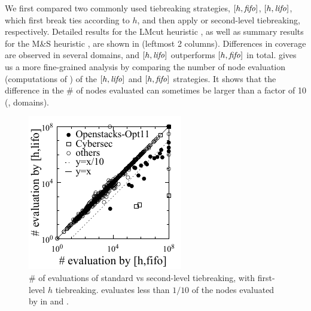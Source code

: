 We first compared two commonly used tiebreaking strategies, $[h,{\mbox{\textit{fifo}}}]$, $[h,{\mbox{\textit{lifo}}}]$, which
first break ties according to $h$, and then apply \fifo or \lifo
second-level tiebreaking, respectively.
Detailed results for the LMcut heuristic \cite{Helmert2009}, as well as summary results for the M\&S heuristic \cite{HelmertHHN14}, are
shown in  (leftmost 2 columns).
Differences in coverage are observed in several domains, and
$[h,{\mbox{\textit{lifo}}}]$ outperforms $[h,{\mbox{\textit{fifo}}}]$ in total.
 gives us a
more fine-grained analysis by comparing the number of node evaluation
(computations of \lmcut) of the $[h,{\mbox{\textit{lifo}}}]$ and $[h,{\mbox{\textit{fifo}}}]$ strategies.
It shows that the difference in the \# of nodes
evaluated can sometimes be larger than a factor of 10 (,  domains).
\begin{figure}[tb]
 \centering {}
 \includegraphics{tables/aaai16-30min-5min-cut/aaai16prelim3/evaluated-lmcut_ff-lmcut_lf-mono.pdf}
 \caption{\# of evaluations of standard \fifo vs
 \lifo second-level tiebreaking, with first-level $h$
 tiebreaking. \lifo evaluates  less than $1/10$ of the nodes evaluated
 by \fifo in  and . 
 }
 \label{fig:f-h-eval}
\end{figure}


